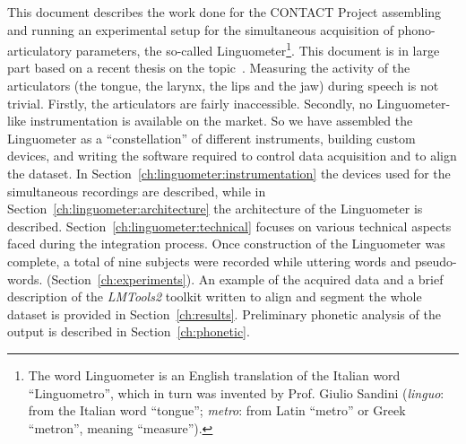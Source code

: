 This document
describes the work done for the 
CONTACT Project assembling and running an experimental setup for the 
simultaneous acquisition of phono-articulatory parameters, the so-called 
Linguometer\footnote{The 
word Linguometer is an English translation of the Italian word
``Linguometro'', which in turn was invented by Prof. Giulio Sandini
(\emph{linguo}: from the Italian word ``tongue''; \emph{metro}: from Latin 
``metro'' or Greek ``metron'', meaning ``measure'').}.
This document is in large part based on a recent thesis on 
the topic~\cite{tavella2007simultaneous}.
%
%
Measuring the activity of the articulators (the tongue, the larynx, the lips and
the jaw) during speech is not trivial. 
Firstly, the articulators are fairly inaccessible.
Secondly, no Linguometer-like instrumentation is available on the market.
So we have assembled the Linguometer as a ``constellation'' of
different instruments, building custom devices, and 
writing the software required to control data acquisition and to align the
dataset.
In Section~\ref{ch:linguometer:instrumentation} the devices
used for the simultaneous recordings are described, while in 
Section~\ref{ch:linguometer:architecture} the architecture of
the Linguometer is described. Section~\ref{ch:linguometer:technical}
focuses on various technical aspects faced during the integration
process.
%
Once construction of the Linguometer was complete, a total of nine
subjects were recorded while uttering words and pseudo-words.
(Section~\ref{ch:experiments}).
An example of the acquired data and a brief description of the \emph{LMTools2}
toolkit written to align and segment
the whole dataset is provided in Section~\ref{ch:results}.
Preliminary phonetic analysis of the output is 
described in Section~\ref{ch:phonetic}.

\pagebreak

